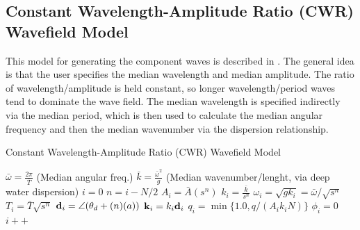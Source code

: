 \documentclass[11pt]{article}
\begin{document}
\subsection{Constant Wavelength-Amplitude Ratio (CWR) Wavefield Model}

This model for generating the component waves is described in \cite{gpugems_waves}.  The general idea is that the user specifies the median wavelength and median amplitude.  The ratio of wavelength/amplitude is held constant, so longer wavelength/period waves tend to dominate the wave field. The median wavelength is specified indirectly via the median period, which is then used to calculate the median angular frequency and then the median wavenumber via the dispersion relationship.

\begin{algorithm}
  \caption{Constant Wavelength-Amplitude Ratio (CWR) Wavefield Model}
  \begin{algorithmic}
    \STATE $\bar{\omega} = \frac{2 \pi}{\bar{T}}$ (Median angular freq.)
    \STATE $\bar{k}= \frac{\bar{\omega}^2}{g}$ (Median wavenumber/lenght, via deep water dispersion)
    \STATE $i = 0$
    \STATE $n=i - N/2$
    \STATE $A_i = \bar{A} (s^n)$
    \STATE $k_i = \frac{\bar{k}}{s^n}$
    \STATE $\omega_i = \sqrt{g k_i} = \bar{\omega}/ \sqrt{s^n}$
    \STATE $T_i = \bar{T} \sqrt{s^n}$
    \STATE $\mbox{${\bf d}_{i}$} = \angle{(\theta_d + (n)(a))}$
    \STATE $\mbox{${\bf k}_{i}$} = k_i \mbox{${\bf d}_{i}$}$
    \STATE $q_i = \min{\{1.0, q/(A_i k_i N)\}}$
    \STATE $\phi_i = 0$
    \STATE $i++$
    \ENDFOR
  \end{algorithmic}
\end{algorithm}



\end{document}
